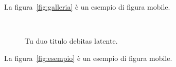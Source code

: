 La figura~\vref{fig:galleria} è un esempio di figura mobile.

\lipsum[3]

\begin{figure}[tb]
\centering
{} \quad
{} \\
 \quad
{}
\caption[Tu duo titulo debitas latente]{Tu duo titulo debitas
latente.}
\label{fig:esempio}
\end{figure}

La figura~\vref{fig:esempio} è un esempio di figura mobile.

\lipsum[4]
